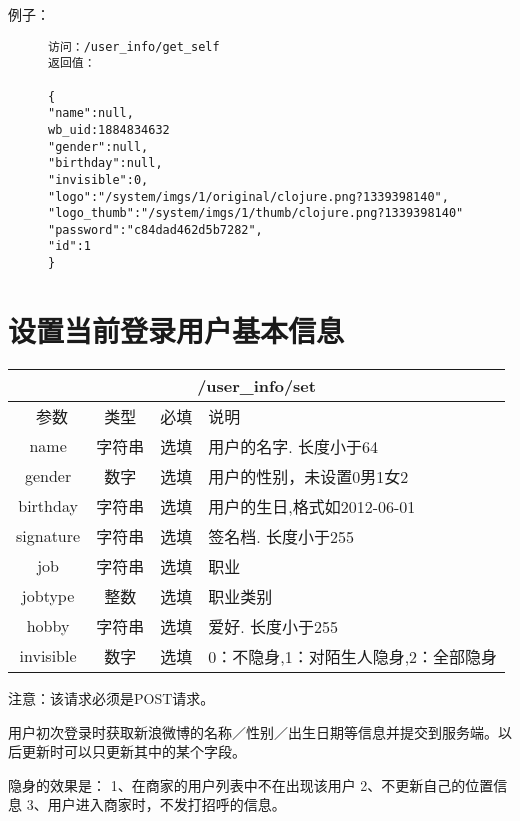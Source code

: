 \documentclass[cs4size]{ctexartutf8}
\begin{document}
例子：

\begin{figure}[H]
\begin{verbatim}
访问：/user_info/get_self
返回值：

{
"name":null,
wb_uid:1884834632
"gender":null,
"birthday":null,
"invisible":0,
"logo":"/system/imgs/1/original/clojure.png?1339398140",
"logo_thumb":"/system/imgs/1/thumb/clojure.png?1339398140"
"password":"c84dad462d5b7282",
"id":1
}

\end{verbatim}
\end{figure}



\section{设置当前登录用户基本信息}

\begin{table}[H]
   \begin{center}
\begin{tabular}{|c|c|c|p{12cm}|}
\hline
\multicolumn{4}{|c|}{/user\_info/set} \\
\hline\hline
 \  参数  & 类型 & 必填 &  说明  \\
\hline
 name  & 字符串 & 选填 &  用户的名字. 长度小于64\\
\hline
 gender  & 数字 & 选填 &  用户的性别，未设置0男1女2\\
\hline
 birthday  & 字符串 & 选填 &  用户的生日,格式如2012-06-01\\
 \hline
 signature  & 字符串 & 选填 &  签名档. 长度小于255\\
 \hline
 job  & 字符串 & 选填 &  职业\\
 \hline
 jobtype  & 整数 & 选填 &  职业类别\\
 \hline
 hobby  & 字符串 & 选填 &  爱好. 长度小于255\\
 \hline
 invisible  & 数字 & 选填 &  0：不隐身,1：对陌生人隐身,2：全部隐身\\
\hline
\end{tabular}
   \end{center}
\end{table}

注意：该请求必须是POST请求。

用户初次登录时获取新浪微博的名称／性别／出生日期等信息并提交到服务端。以后更新时可以只更新其中的某个字段。

隐身的效果是：
1、在商家的用户列表中不在出现该用户
2、不更新自己的位置信息
3、用户进入商家时，不发打招呼的信息。
\end{document}
